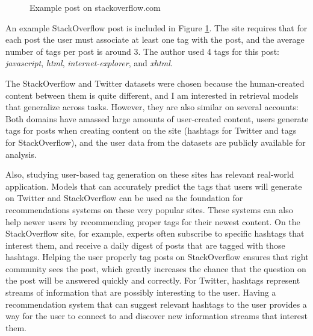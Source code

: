 \documentclass[man,floatsintext,donotrepeattitle]{apa6}
\begin{document}
\begin{figure}[!htbp]
  \caption{Example post on stackoverflow.com}
  \label{figSOExample}
\end{figure}

An example StackOverflow post is included in Figure \ref{figSOExample}.
The site requires that for each post the user must associate at least one tag with the post, and the average number of tags per post is around 3.
The author used 4 tags for this post: \emph{javascript}, \emph{html}, \emph{internet-explorer}, and \emph{xhtml}.

The StackOverflow and Twitter datasets were chosen because the human-created content between them is quite different, and I am interested in retrieval models that generalize across tasks.
However, they are also similar on several accounts:
Both domains have amassed large amounts of user-created content, users generate tags for posts when creating content on the site (hashtags for Twitter and tags for StackOverflow),
and the user data from the datasets are publicly available for analysis.

Also, studying user-based tag generation on these sites has relevant real-world application.
Models that can accurately predict the tags that users will generate on Twitter and StackOverflow can be used as the foundation for recommendations systems on these very popular sites.
These systems can also help newer users by recommending proper tags for their newest content.
On the StackOverflow site, for example, experts often subscribe to specific hashtags that interest them, and receive a daily digest of posts that are tagged with those hashtags.
Helping the user properly tag posts on StackOverflow ensures that right community sees the post, which greatly increases the chance that the question on the post will be answered quickly and correctly.
For Twitter, hashtags represent streams of information that are possibly interesting to the user.
Having a recommendation system that can suggest relevant hashtags to the user provides a way for the user to connect to and discover new information streams that interest them.
\end{document}
